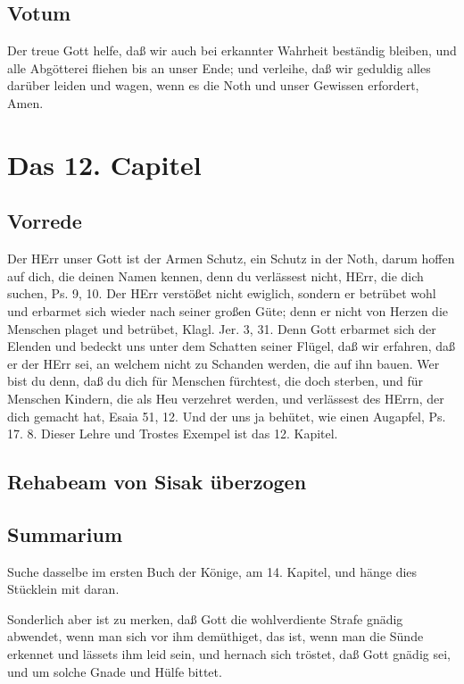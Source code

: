 \section{Votum}

Der treue Gott helfe, daß wir auch bei erkannter Wahrheit beständig bleiben, und alle Abgötterei fliehen bis an unser Ende; und verleihe, daß wir geduldig alles darüber leiden und wagen, wenn es die Noth und unser Gewissen erfordert, Amen.

\chapter{Das 12. Capitel}

\section{Vorrede}

Der HErr unser Gott ist der Armen Schutz, ein Schutz in der Noth, darum hoffen auf dich, die deinen Namen kennen, denn du verlässest nicht, HErr, die dich suchen, Ps. 9, 10. Der HErr verstößet nicht ewiglich, sondern er betrübet wohl und erbarmet sich wieder nach seiner großen Güte; denn er nicht von Herzen die Menschen plaget und betrübet, Klagl. Jer. 3, 31. Denn Gott erbarmet sich der Elenden und bedeckt uns unter dem Schatten seiner Flügel, daß wir erfahren, daß er der HErr sei, an welchem nicht zu Schanden werden, die auf ihn bauen. Wer bist du denn, daß du dich für Menschen fürchtest, die doch sterben, und für Menschen Kindern, die als Heu verzehret werden, und verlässest des HErrn, der dich gemacht hat, Esaia 51, 12. Und der uns ja behütet, wie einen Augapfel, Ps. 17. 8. Dieser Lehre und Trostes Exempel ist das 12. Kapitel.

\section[Rehabeam von Sisak überzogen]{Rehabeam von Sisak überzogen}

\section{Summarium}

Suche dasselbe im ersten Buch der Könige, am 14. Kapitel, und hänge dies Stücklein mit daran.

Sonderlich aber ist zu merken, daß Gott die wohlverdiente Strafe gnädig abwendet, wenn man sich vor ihm demüthiget, das ist, wenn man die Sünde erkennet und lässets ihm leid sein, und hernach sich tröstet, daß Gott gnädig sei, und um solche Gnade und Hülfe bittet.

